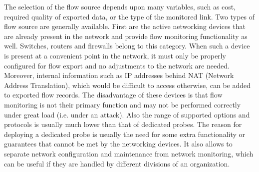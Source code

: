 The selection of the flow source depends upon many variables, such as cost, required quality of exported data, or the type of the monitored link. Two types of flow source are generally available. First are the active networking devices that are already present in the network and provide flow monitoring functionality as well. Switches, routers and firewalls belong to this category. When such a device is present at a convenient point in the network, it must only be properly configured for flow export and no adjustments to the network are needed. Moreover, internal information such as IP addresses behind NAT (Network Address Translation), which would be difficult to access otherwise, can be added to exported flow records. The disadvantage of these devices is that flow monitoring is not their primary function and may not be performed correctly under great load (i.e. under an attack). Also the range of supported options and protocols is usually much lower than that of dedicated probes. The reason for deploying a dedicated probe is usually the need for some extra functionality or guarantees that cannot be met by the networking devices. It also allows to separate network configuration and maintenance from network monitoring, which can be useful if they are handled by different divisions of an organization.

